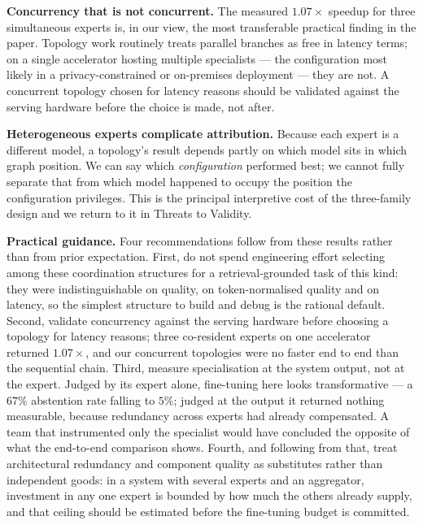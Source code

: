 \documentclass[journal,10pt,compsoc,onecolumn]{IEEEtran}
\begin{document}
\textbf{Concurrency that is not concurrent.} The measured $1.07\times$ speedup for
three simultaneous experts is, in our view, the most transferable practical
finding in the paper. Topology work routinely treats parallel branches as free in
latency terms; on a single accelerator hosting multiple specialists --- the
configuration most likely in a privacy-constrained or on-premises deployment ---
they are not. A concurrent topology chosen for latency reasons should be validated
against the serving hardware before the choice is made, not after.

\textbf{Heterogeneous experts complicate attribution.} Because each expert is a
different model, a topology's result depends partly on which model sits in which
graph position. We can say which \emph{configuration} performed best; we cannot
fully separate that from which model happened to occupy the position the
configuration privileges. This is the principal interpretive cost of the
three-family design and we return to it in Threats to Validity.

\textbf{Practical guidance.} Four recommendations follow from these results
rather than from prior expectation. First, do not spend engineering effort
selecting among these coordination structures for a retrieval-grounded task of
this kind: they were indistinguishable on quality, on token-normalised quality
and on latency, so the simplest structure to build and debug is the rational
default. Second, validate concurrency against the serving hardware before
choosing a topology for latency reasons; three co-resident experts on one
accelerator returned $1.07\times$, and our concurrent topologies were no faster
end to end than the sequential chain. Third, measure specialisation at the
system output, not at the expert. Judged by its expert alone, fine-tuning here
looks transformative --- a $67\%$ abstention rate falling to $5\%$; judged at
the output it returned nothing measurable, because redundancy across experts had
already compensated. A team that instrumented only the specialist would have
concluded the opposite of what the end-to-end comparison shows. Fourth, and
following from that, treat architectural redundancy and component quality as
substitutes rather than independent goods: in a system with several experts and
an aggregator, investment in any one expert is bounded by how much the others
already supply, and that ceiling should be estimated before the fine-tuning
budget is committed.

\end{document}
